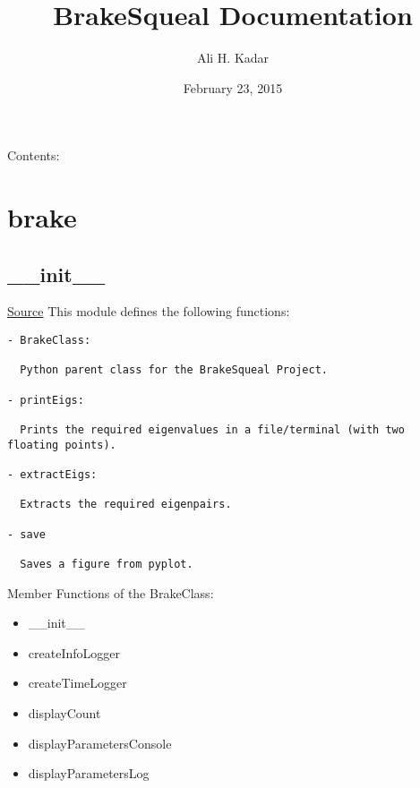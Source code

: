 \documentclass[letterpaper,10pt,english]{sphinxmanual}
\title{BrakeSqueal Documentation}
\date{February 23, 2015}
\author{Ali H. Kadar}
\begin{document}
\maketitle
\tableofcontents
{}\label{index::doc}


Contents:


\chapter{brake}
\label{index:brake}\label{index:welcome-to-brakesqueal-s-documentation}

\section{\_\_init\_\_}
\label{index:init}
\href{https://bitbucket.org/akadar/brakesqueal0.1/src/master/brake/\_\_init\_\_.py?at=master}{Source}
\label{index:module-brake.__init__}
This module defines the following functions:

\begin{Verbatim}[commandchars=\\\{\}]
- BrakeClass:

  Python parent class for the BrakeSqueal Project.
  
- printEigs:
  
  Prints the required eigenvalues in a file/terminal (with two floating points).
  
- extractEigs:
 
  Extracts the required eigenpairs.
  
- save
  
  Saves a figure from pyplot.
\end{Verbatim}

\begin{fulllineitems}
\label{index:brake.__init__.BrakeClass}
Member Functions of the BrakeClass:
\begin{itemize}
\item {} 
\_\_init\_\_

\item {} 
createInfoLogger

\item {} 
createTimeLogger

\item {} 
displayCount

\item {} 
displayParametersConsole

\item {} 
displayParametersLog

\end{itemize}

\end{fulllineitems}
\end{document}
